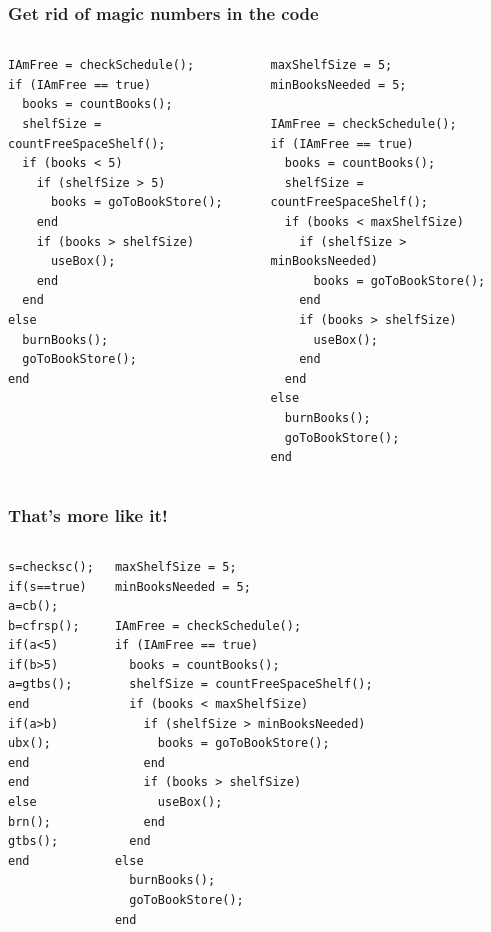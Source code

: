 \begin{frame}[fragile]
 \frametitle{Get rid of magic numbers in the code}
 \begin{columns}[T]
     \begin{lstlisting}[basicstyle=\scriptsize\ttfamily]
IAmFree = checkSchedule();
if (IAmFree == true)
  books = countBooks();
  shelfSize = countFreeSpaceShelf();
  if (books < 5)
    if (shelfSize > 5)
      books = goToBookStore();
    end
    if (books > shelfSize)
      useBox();
    end
  end
else
  burnBooks();
  goToBookStore();
end
 \end{lstlisting}
     \begin{lstlisting}[basicstyle=\scriptsize\ttfamily,emph={minBooksNeeded,maxShelfSize},emphstyle=\color{red}]
maxShelfSize = 5;
minBooksNeeded = 5;

IAmFree = checkSchedule();
if (IAmFree == true)
  books = countBooks();
  shelfSize = countFreeSpaceShelf();
  if (books < maxShelfSize)
    if (shelfSize > minBooksNeeded)
      books = goToBookStore();
    end
    if (books > shelfSize)
      useBox();
    end
  end
else
  burnBooks();
  goToBookStore();
end
 \end{lstlisting}
 \end{columns}
\end{frame}

\begin{frame}[fragile]
 \frametitle{That's more like it!}
 \begin{columns}[T]
     \begin{lstlisting}
s=checksc();
if(s==true)
a=cb();
b=cfrsp();
if(a<5)
if(b>5)
a=gtbs();
end
if(a>b)
ubx();
end
end
else
brn();
gtbs();
end
 \end{lstlisting}
     \begin{lstlisting}
maxShelfSize = 5;
minBooksNeeded = 5;

IAmFree = checkSchedule();
if (IAmFree == true)
  books = countBooks();
  shelfSize = countFreeSpaceShelf();
  if (books < maxShelfSize)
    if (shelfSize > minBooksNeeded)
      books = goToBookStore();
    end
    if (books > shelfSize)
      useBox();
    end
  end
else
  burnBooks();
  goToBookStore();
end
 \end{lstlisting}
 \end{columns}
\end{frame}

